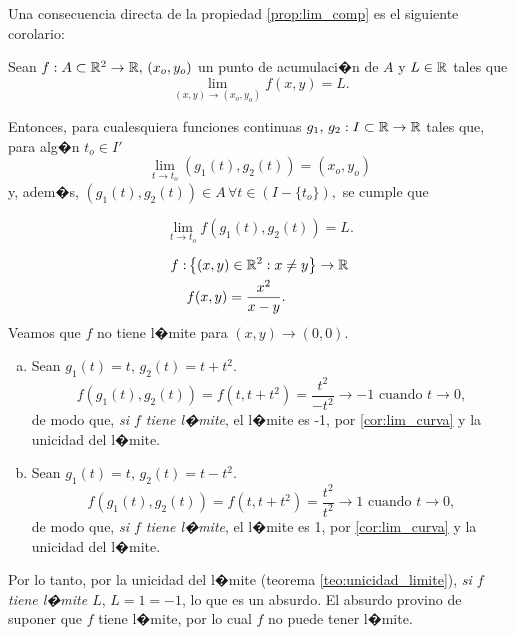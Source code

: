 \documentclass[a4paper]{scrartcl} %
\begin{document}
Una consecuencia directa de la propiedad \eqref{prop:lim_comp} es el siguiente corolario: 
\begin{corolario}  \label{cor:lim_curva}
  Sean $f: A \subset \mathbb{R}^2 \to \mathbb{R}, \, (x_o,y_o)$ un punto de acumulaci�n de $A$ y $L \in \mathbb{R}$ tales que 
  \[
   \lim_{(x,y) \to (x_o,y_o)} f(x,y) = L.
  \]

  Entonces, para cualesquiera funciones continuas $g_1, \, g_2 : I \subset \mathbb{R} \to \mathbb{R}$ tales que, para alg�n $t_o \in I'$
  \[
    \lim_{t \to t_o} \left( g_1(t),g_2(t) \right) = \left( x_o , y_o \right)
  \]
  y, adem�s, $\left( g_1(t), g_2(t) \right) \in A \, \forall t \in \left( I - \{t_o\} \right),$ se cumple que
  
  \[
   \lim_{t \to t_o} f\left( g_1(t),g_2(t) \right) = L.
  \]
\end{corolario}
\begin{exmp}
 \begin{align*}
   f: &\left\lbrace (x,y) \in \mathbb{R}^2 : x \ne y \right\rbrace \to \mathbb{R} \\
   &f(x,y) = \frac{x^2}{x - y}.
  \end{align*} 
  Veamos que $f$ no tiene l�mite para $(x,y) \to (0,0)$.
  \begin{enumerate} [(a)]
   \item  Sean $g_1(t) = t, \, g_2(t) = t + t^2$.
  \[
   f(g_1(t),g_2(t)) = f(t,t + t^2) = \frac{t^2}{-t^2} \to -1 \text{ cuando } t \to 0,
  \]
  de modo que, \emph{si $f$ tiene l�mite}, el l�mite es -1, por \eqref{cor:lim_curva} y la unicidad del l�mite.
  \item  Sean $g_1(t) = t, \, g_2(t) = t - t^2$.
  \[
   f(g_1(t),g_2(t)) = f(t,t + t^2) = \frac{t^2}{t^2} \to 1 \text{ cuando } t \to 0,
  \]
  de modo que, \emph{si $f$ tiene l�mite}, el l�mite es 1, por \eqref{cor:lim_curva} y la unicidad del l�mite.
  \end{enumerate}
  Por lo tanto, por la unicidad del l�mite (teorema \eqref{teo:unicidad_limite}), \emph{si $f$ tiene l�mite $L$}, $L = 1 = -1$, lo que es un absurdo. El absurdo provino de suponer que $f$ tiene l�mite, por lo cual $f$ no puede tener l�mite.
\end{exmp}
\end{document}
